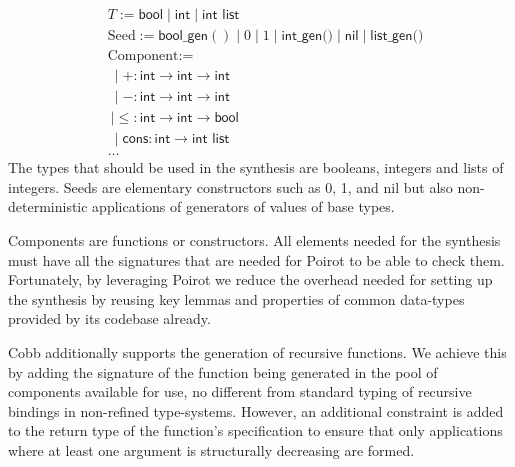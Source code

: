 \documentclass[review, sigplan]{acmart}
\begin{document}
\begin{align*}
     & T := \textsf{bool} \mid \textsf{int} \mid \textsf{int list}                                                            \\
     & \text{Seed} := \textsf{bool\_gen}() \mid 0 \mid 1 \mid \textsf{int\_gen()} \mid \textsf{nil} \mid \textsf{list\_gen()} \\
     & \text{Component} :=                                                                                                    \\
     & \  \mid +: \textsf{int} \rightarrow \textsf{int} \rightarrow \textsf{int}                                              \\
     & \  \mid -: \textsf{int} \rightarrow \textsf{int} \rightarrow \textsf{int}                                              \\
     & \  \mid \leq: \textsf{int} \rightarrow \textsf{int} \rightarrow \textsf{bool}                                          \\
     & \  \mid \textsf{cons}: \textsf{int} \rightarrow \textsf{int list}                                                      \\
     & \dots
\end{align*}
The types that should be used in the synthesis are
booleans, integers and lists of integers.
Seeds are elementary constructors such as 0, 1, and \textsf{nil}
but also non-deterministic applications of generators of values of
base types.

Components are functions or constructors.
All elements needed for the synthesis must have all the signatures
that are needed for Poirot to be able to check them.
Fortunately, by leveraging Poirot we reduce the overhead needed for setting
up the synthesis by reusing key lemmas and properties of common
data-types provided by its codebase already.

Cobb additionally supports the generation of recursive functions.
We achieve this by adding the signature of the function being
generated in the pool of components available for use,
no different from standard typing of recursive bindings in non-refined
type-systems.
However, an additional constraint is added to the return type
of the function's specification to ensure that only applications
where at least one argument is structurally decreasing are formed.
\end{document}

